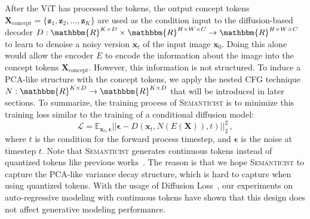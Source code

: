 \documentclass[10pt,twocolumn,letterpaper]{article}
\DeclareRobustCommand{\modelname}{\textsc{Semanticist}\xspace}
\begin{document}
After the ViT has processed the tokens, the output concept tokens $\bm{X}_{\text{concept}}=\{\bm{z}_1, \bm{z}_2, \dots, \bm{z}_K\}$ are used as the condition input to the diffusion-based decoder $D:\mathbbm{R}^{K\times D}\times\mathbbm{R}^{H\times W\times C}\rightarrow\mathbbm{R}^{H\times W\times C}$ to learn to denoise a noisy version $\bm{x}_t$ of the input image $\bm{x}_0$.
Doing this alone would allow the encoder $E$ to encode the information about the image into the concept tokens $\bm{X}_{\text{concept}}$.
However, this information is not structured.
To induce a PCA-like structure with the concept tokens, we apply the nested CFG technique $N:\mathbbm{R}^{K\times D}\rightarrow\mathbbm{R}^{K\times D}$ that will be introduced in later sections.
To summarize, the training process of \modelname is to minimize this training loss similar to the training of a conditional diffusion model:
\begin{equation}
\mathcal{L}=\mathbb{E}_{\bm{x}_0, \bm{\epsilon}}||\bm{\epsilon}-D(\bm{x}_t, N(E(\bm{X})), t)||^2_2 \,, \nonumber
\end{equation}
where $t$ is the condition for the forward process timestep, and $\bm{\epsilon}$ is the noise at timestep $t$.
Note that \modelname generates continuous tokens instead of quantized tokens like previous works~\cite{llamagen,titok}.
The reason is that we hope \modelname to capture the PCA-like variance decay structure, which is hard to capture when using quantized tokens. 
With the usage of Diffusion Loss~\cite{mar}, our experiments on auto-regressive modeling with continuous tokens have shown that this design does not affect generative modeling performance.
\end{document}
